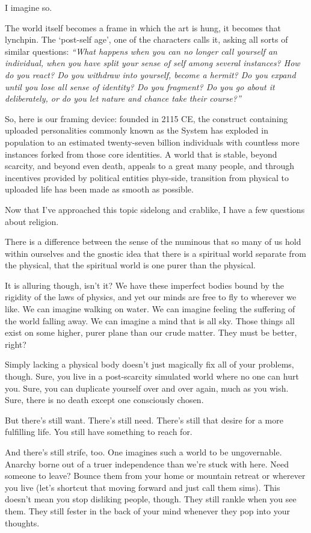 I imagine so.

The world itself becomes a frame in which the art is hung, it becomes that lynchpin. The `post-self age', one of the characters calls it, asking all sorts of similar questions: \emph{``What happens when you can no longer call yourself an individual, when you have split your sense of self among several instances? How do you react? Do you withdraw into yourself, become a hermit? Do you expand until you lose all sense of identity? Do you fragment? Do you go about it deliberately, or do you let nature and chance take their course?''}

So, here is our framing device: founded in 2115 CE, the construct containing uploaded personalities commonly known as the System has exploded in population to an estimated twenty-seven billion individuals with countless more instances forked from those core identities. A world that is stable, beyond scarcity, and beyond even death, appeals to a great many people, and through incentives provided by political entities phys-side, transition from physical to uploaded life has been made as smooth as possible.

Now that I've approached this topic sidelong and crablike, I have a few questions about religion.

There is a difference between the sense of the numinous that so many of us hold within ourselves and the gnostic idea that there is a spiritual world separate from the physical, that the spiritual world is one purer than the physical.

It is alluring though, isn't it? We have these imperfect bodies bound by the rigidity of the laws of physics, and yet our minds are free to fly to wherever we like. We can imagine walking on water. We can imagine feeling the suffering of the world falling away. We can imagine a mind that is all sky. Those things all exist on some higher, purer plane than our crude matter. They must be better, right?

Simply lacking a physical body doesn't just magically fix all of your problems, though. Sure, you live in a post-scarcity simulated world where no one can hurt you. Sure, you can duplicate yourself over and over again, much as you wish. Sure, there is no death except one consciously chosen.

But there's still want. There's still need. There's still that desire for a more fulfilling life. You still have something to reach for.

And there's still strife, too. One imagines such a world to be ungovernable. Anarchy borne out of a truer independence than we're stuck with here. Need someone to leave? Bounce them from your home or mountain retreat or wherever you live (let's shortcut that moving forward and just call them sims). This doesn't mean you stop disliking people, though. They still rankle when you see them. They still fester in the back of your mind whenever they pop into your thoughts.


